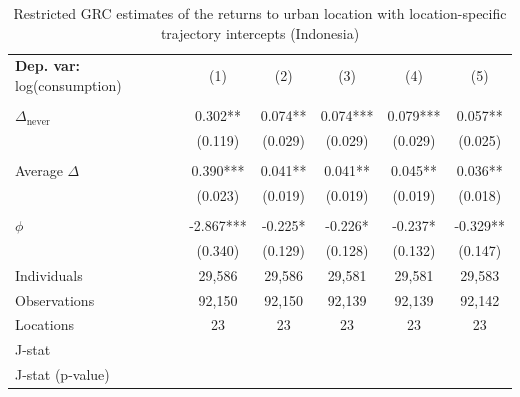\begin{table}[htbp] \centering \begin{threeparttable}
 \caption{Restricted GRC estimates of the returns to urban location with location-specific trajectory intercepts (Indonesia)} 
 \label{tab:verdier_robust_onestep_IDN_consumption_urban_unb} 
\begin{tabular}{l ccccc} \toprule  \textbf{Dep. var:}  log(consumption) 
                    &\multicolumn{1}{c}{(1)}   &\multicolumn{1}{c}{(2)}   &\multicolumn{1}{c}{(3)}   &\multicolumn{1}{c}{(4)}   &\multicolumn{1}{c}{(5)}   \\
                    &               &               &               &               &               \\
\addlinespace
$\Delta_{\text{never}}$&       0.302** &       0.074** &       0.074***&       0.079***&       0.057** \\
                    &     (0.119)   &     (0.029)   &     (0.029)   &     (0.029)   &     (0.025)   \\
                    &               &               &               &               &               \\
\addlinespace
Average $\Delta$    &       0.390***&       0.041** &       0.041** &       0.045** &       0.036** \\
                    &     (0.023)   &     (0.019)   &     (0.019)   &     (0.019)   &     (0.018)   \\
                    &               &               &               &               &               \\
\addlinespace
$\phi$              &      -2.867***&      -0.225*  &      -0.226*  &      -0.237*  &      -0.329** \\
                    &     (0.340)   &     (0.129)   &     (0.128)   &     (0.132)   &     (0.147)   \\
\addlinespace
Individuals         &      29,586   &      29,586   &      29,581   &      29,581   &      29,583   \\
Observations        &      92,150   &      92,150   &      92,139   &      92,139   &      92,142   \\
Locations           &          23   &          23   &          23   &          23   &          23   \\
J-stat              &               &               &               &               &               \\
J-stat (p-value)    &               &               &               &               &               \\

\end{tabular}
\end{threeparttable}
\end{table}
